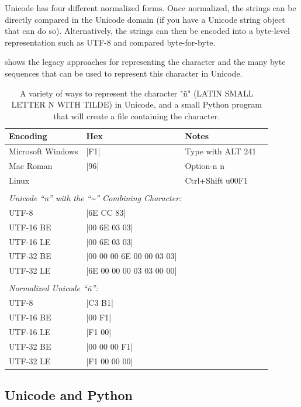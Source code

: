 Unicode  has four different normalized forms. Once normalized, the strings can be directly compared in the Unicode domain (if you have a Unicode string object that can do so).
Alternatively, the strings can then be encoded into a byte-level representation such as UTF-8 and compared byte-for-byte. 

 shows the legacy approaches for representing the character and the many byte sequences that can be used to represent this character in Unicode. 

\begin{table}
\begin{tabular}{llll}
\hline
Encoding & Hex    & Notes & \\
\hline
Microsoft Windows &  |F1|      &  Type with ALT 241\\
Mac Roman         &  |96|      & Option-n n \\
Linux             &            & Ctrl+Shift u00F1\\
\hline\\
\multicolumn{4}{l}{\emph{Unicode ``n'' with the ``\~{}'' Combining Character:}}\\
UTF-8     & |6E CC 83|\\
UTF-16 BE & |00 6E 03 03|\\
UTF-16 LE & |00 6E 03 03|\\
UTF-32 BE & |00 00 00 6E 00 00 03 03|\\
UTF-32 LE & |6E 00 00 00 03 03 00 00|\\
\hline
\\
\multicolumn{4}{l}{\emph{Normalized Unicode ``\~n'':}}\\
UTF-8   &  |C3 B1|          & \\
UTF-16 BE         &  |00 F1|          & \\
UTF-16 LE         &  |F1 00|          & \\
UTF-32 BE         &  |00 00 00 F1|    & \\
UTF-32 LE         &  |F1 00 00 00|    & \\
\hline
\end{tabular}
\caption{A variety of ways to represent the character "\~n" (LATIN SMALL LETTER N WITH TILDE) in Unicode, and a small Python program that will create a file containing the character.}\label{unicode-n}
\end{table}

\subsection{Unicode and Python}


